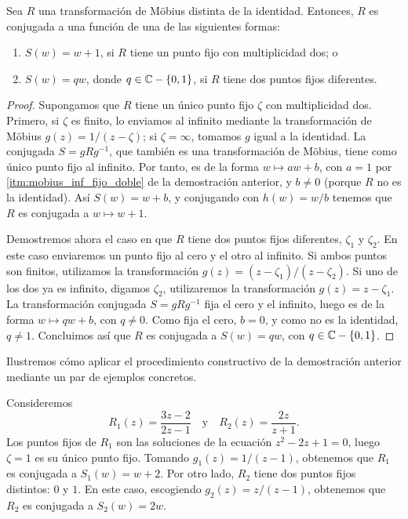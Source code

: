 \begin{proposicion}
  \label{prp:mobius_normal_form}
  Sea $R$ una transformación de Möbius distinta de la identidad. Entonces, $R$
  es conjugada a una función de una de las siguientes formas:
  \begin{enumerate}[label=(\arabic*)]
    \item $S(w) = w + 1$, si $R$ tiene un punto fijo con multiplicidad dos; o
    \item $S(w) = qw$, donde $q \in \mathbb{C} - \{0, 1\}$, si $R$ tiene dos puntos
          fijos diferentes.
  \end{enumerate}
\end{proposicion}
\begin{proof}
  Supongamos que $R$ tiene un único punto fijo $\zeta$ con multiplicidad dos.
  Primero, si $\zeta$ es finito, lo enviamos al infinito mediante la
  transformación de Möbius $g(z) = 1/(z - \zeta)$; si $\zeta=\infty$, tomamos
  $g$ igual a la identidad. La conjugada $S = g R g^{-1}$, que también es una
  transformación de Möbius, tiene como único punto fijo al infinito. Por tanto,
  es de la forma $w \mapsto aw + b$, con $a = 1$ por
  \ref{itm:mobius_inf_fijo_doble} de la demostración anterior, y $b \neq 0$
  (porque $R$ no es la identidad). Así $S(w) = w + b$, y conjugando con $h(w) =
  w/b$ tenemos que $R$ es conjugada a $w \mapsto w + 1$.

  Demostremos ahora el caso en que $R$ tiene dos puntos fijos diferentes,
  $\zeta_1$ y $\zeta_2$. En este caso enviaremos un punto fijo al cero y el
  otro al infinito. Si ambos puntos son finitos, utilizamos la transformación
  $g(z) = (z - \zeta_1)/(z - \zeta_2)$. Si uno de los dos ya es infinito,
  digamos $\zeta_2$, utilizaremos la transformación $g(z) = z - \zeta_1$. La
  transformación conjugada $S = g R g^{-1}$ fija el cero y el infinito, luego
  es de la forma $w \mapsto qw + b$, con $q \neq 0$. Como fija el cero, $b =
  0$, y como no es la identidad, $q \neq 1$. Concluimos así que $R$ es
  conjugada a $S(w) = qw$, con $q \in \mathbb{C} - \{0, 1\}$.
\end{proof}

Ilustremos cómo aplicar el procedimiento constructivo de la demostración
anterior mediante un par de ejemplos concretos.

\begin{ejemplo}
  \label{ej:mobius_iniciales}
  Consideremos
  \begin{equation}
    R_1(z) = \frac{3z - 2}{2z - 1} \quad \text{y} \quad R_2(z) = \frac{2z}{z+1}.
  \end{equation}
  Los puntos fijos de $R_1$ son las soluciones de la ecuación $z^2 - 2z +1 =
  0$, luego $\zeta = 1$ es su único punto fijo. Tomando $g_1(z) = 1/(z - 1)$,
  obtenemos que $R_1$ es conjugada a $S_1(w) = w + 2$. Por otro lado, $R_2$
  tiene dos puntos fijos distintos: $0$ y $1$. En este caso, escogiendo $g_2(z)
  = z/(z-1)$, obtenemos que $R_2$ es conjugada a $S_2(w) = 2w$.
\end{ejemplo}

